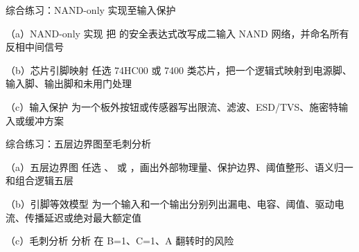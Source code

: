 \begin{chapterexercise}{综合练习：NAND-only 实现至输入保护}
\begin{exercisesubproblem}{（a）NAND-only 实现}
把  的安全表达式改写成二输入 NAND 网络，并命名所有反相中间信号
\end{exercisesubproblem}
\begin{exercisesubproblem}{（b）芯片引脚映射}
任选 74HC00 或 7400 类芯片，把一个逻辑式映射到电源脚、输入脚、输出脚和未用门处理
\end{exercisesubproblem}
\begin{exercisesubproblem}{（c）输入保护}
为一个板外按钮或传感器写出限流、滤波、ESD/TVS、施密特输入或缓冲方案
\end{exercisesubproblem}
\end{chapterexercise}

\begin{chapterexercise}{综合练习：五层边界图至毛刺分析}
\begin{exercisesubproblem}{（a）五层边界图}
任选 、 或 ，画出外部物理量、保护边界、阈值整形、语义归一和组合逻辑五层
\end{exercisesubproblem}
\begin{exercisesubproblem}{（b）引脚等效模型}
为一个输入和一个输出分别列出漏电、电容、阈值、驱动电流、传播延迟或绝对最大额定值
\end{exercisesubproblem}
\begin{exercisesubproblem}{（c）毛刺分析}
分析  在 B=1、C=1、A 翻转时的风险
\end{exercisesubproblem}
\end{chapterexercise}

